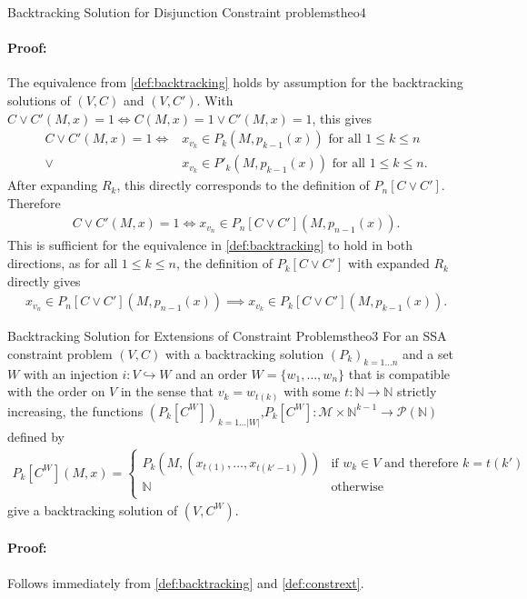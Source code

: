 \begin{theorem}{Backtracking Solution for Disjunction Constraint problems}{theo4}
    \paragraph*{Proof:} The equivalence from \autoref{def:backtracking}
                        holds by assumption for the backtracking solutions
                        of $(V,C)$ and $(V,C')$.
                        With $C\mathrel\lor C'(M,x)=1\iff C(M,x)=1\mathrel\lor C'(M,x)=1$,
                        this gives
    \begin{align*}
        C\mathrel\lor C'(M,x)=1\iff{}&x_{v_k}\in P_k(M,p_{k-1}(x))\text{ for all }1\leq k\leq n\\
                              \mathrel\lor{}&x_{v_k}\in P'_k(M,p_{k-1}(x))\text{ for all }1\leq k\leq n.
    \end{align*}
    After expanding $R_k$, this directly corresponds to the definition of
    $P_n[C\mathrel\lor C']$.
    Therefore
    \begin{align*}
        C\mathrel\lor C'(M,x)=1\iff{}x_{v_n}\in P_n[C\mathrel\lor C'](M,p_{n-1}(x)).
    \end{align*}
    This is sufficient for the equivalence in \autoref{def:backtracking} to hold
    in both directions, as for all $1\leq k\leq n$, the definition of
    $P_k[C\mathrel\lor C']$ with expanded $R_k$ directly gives
    \begin{align*}
        x_{v_n}\in P_n[C\mathrel\lor C'](M,p_{n-1}(x))\implies x_{v_k}\in P_k[C\mathrel\lor C'](M,p_{k-1}(x)).
    \end{align*}
\end{theorem}
\begin{theorem}{Backtracking Solution for Extensions of Constraint Problems}{theo3}
    For an SSA constraint problem $(V,C)$ with a backtracking
    solution $(P_k)_{k=1\dots n}$ and a set $W$ with an injection
    $i:V\hookrightarrow W$ and an order $W=\{w_1,\dots,w_n\}$ that is
    compatible with the order on $V$ in the sense that $v_k=w_{t(k)}$ with
    some $t:\mathbb N\rightarrow\mathbb N$ strictly increasing, the functions
    $(P_k[C^W])_{k=1\dots |W|}$,$P_k[C^W]\colon\mathcal M\times\mathbb N^{k-1}\rightarrow\mathcal P(\mathbb N)$
    defined by
    \begin{align*}
        P_k[C^W](M,x)=\left\{
            \begin{array}{ll}
                P_k\left(M,\left(x_{t(1)},\dots,x_{t(k'-1)}\right)\right)&\text{if }w_k\in V\text{ and therefore }k=t(k')\\
                \mathbb N&\text{otherwise}\\
            \end{array}\right.
    \end{align*}
    give a backtracking solution of $(V,C^W)$.
    \tcblower
    \paragraph*{Proof:} Follows immediately from \autoref{def:backtracking} and \autoref{def:constrext}.
\end{theorem}
